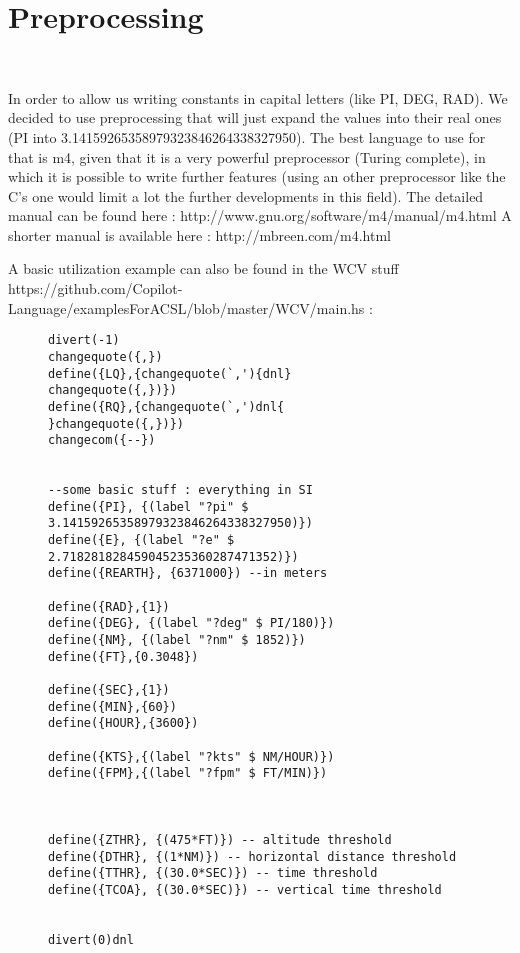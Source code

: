 \section{Preprocessing}~\label{sec:preprocessing}

In order to allow us writing constants in capital letters (like PI, DEG, RAD). We decided to use preprocessing that will just expand the values into their real ones (PI into 3.14159265358979323846264338327950). The best language to use for that is m4, given that it is a very powerful preprocessor (Turing complete), in which it is possible to write further features (using an other preprocessor like the C's one would limit a lot the further developments in this field). The detailed manual can be found here : http://www.gnu.org/software/m4/manual/m4.html
A shorter manual is available here : http://mbreen.com/m4.html 


A basic utilization example can also be found in the WCV stuff https://github.com/Copilot-Language/examplesForACSL/blob/master/WCV/main.hs : 

\begin{figure}[!htb]
\begin{lstlisting}
divert(-1)
changequote({,})
define({LQ},{changequote(`,'){dnl}
changequote({,})})
define({RQ},{changequote(`,')dnl{
}changequote({,})})
changecom({--})


--some basic stuff : everything in SI
define({PI}, {(label "?pi" $ 3.14159265358979323846264338327950)})
define({E}, {(label "?e" $ 2.718281828459045235360287471352)})
define({REARTH}, {6371000}) --in meters

define({RAD},{1})
define({DEG}, {(label "?deg" $ PI/180)})
define({NM}, {(label "?nm" $ 1852)})
define({FT},{0.3048})

define({SEC},{1})
define({MIN},{60})
define({HOUR},{3600})

define({KTS},{(label "?kts" $ NM/HOUR)})
define({FPM},{(label "?fpm" $ FT/MIN)})



define({ZTHR}, {(475*FT)}) -- altitude threshold
define({DTHR}, {(1*NM)}) -- horizontal distance threshold
define({TTHR}, {(30.0*SEC)}) -- time threshold
define({TCOA}, {(30.0*SEC)}) -- vertical time threshold


divert(0)dnl
\end{lstlisting}
\end{figure}



